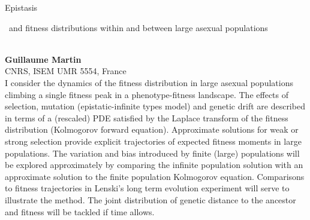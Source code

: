 \documentclass[12pt,a4paper]{article}
\newcommand{\ZAbst}{\rule[-1ex]{0pt}{2ex}\ } %
\begin{document}
\noindent
{\Large Epistasis\ZAbst and fitness distributions within and between large asexual populations}\\[1ex]
{\large 
\textbf{Guillaume Martin}\\[1ex] CNRS, ISEM UMR 5554, France}\\[2ex]
I consider the dynamics of the fitness distribution in large asexual populations climbing a single fitness peak in a phenotype-fitness landscape. The effects of selection, mutation (epistatic-infinite types model)  and genetic drift are described in terms of a (rescaled) PDE satisfied by the Laplace transform of the fitness distribution (Kolmogorov forward equation). Approximate solutions for weak or strong selection provide explicit trajectories of expected  fitness moments in large populations.  The variation and bias  introduced by finite (large) populations will be explored approximately by comparing the infinite population solution with an approximate solution to the finite population Kolmogorov equation. Comparisons to fitness trajectories in Lenski's long term evolution experiment will serve to illustrate the method. The joint distribution of genetic distance to the ancestor and fitness will be tackled if time allows. 

\end{document}
